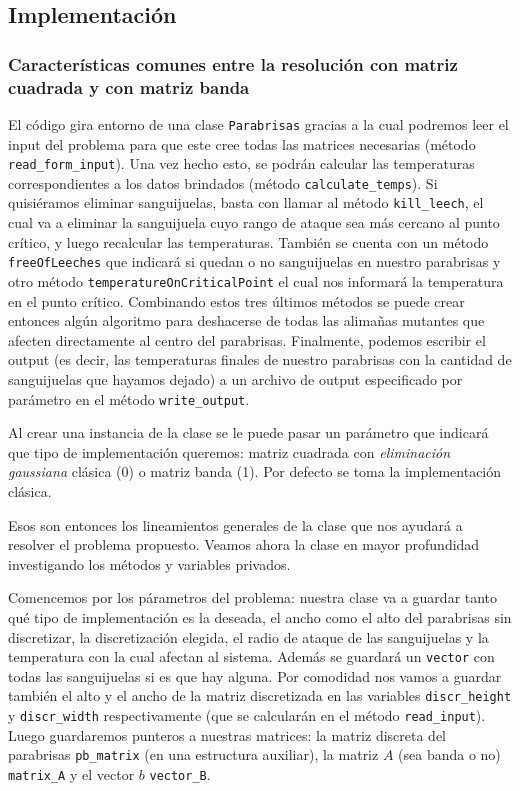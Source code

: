 \subsection{Implementación}

\subsubsection{Características comunes entre la resolución con matriz cuadrada y con matriz banda}

El código gira entorno de una clase \texttt{Parabrisas} gracias a la cual podremos leer el input del problema para que este cree todas las matrices necesarias (método \texttt{read\_form\_input}). Una vez hecho esto, se podrán calcular las temperaturas correspondientes a los datos brindados (método \texttt{calculate\_temps}). Si quisiéramos eliminar sanguijuelas, basta con llamar al método \texttt{kill\_leech}, el cual va a eliminar la sanguijuela cuyo rango de ataque sea más cercano al punto crítico, y luego recalcular las temperaturas. También se cuenta con un método \texttt{freeOfLeeches} que indicará si quedan o no sanguijuelas en nuestro parabrisas y otro método \texttt{temperatureOnCriticalPoint} el cual nos informará la temperatura en el punto crítico. Combinando estos tres últimos métodos se puede crear entonces algún algoritmo para deshacerse de todas las alimañas mutantes que afecten directamente al centro del parabrisas. Finalmente, podemos escribir el output (es decir, las temperaturas finales de nuestro parabrisas con la cantidad de sanguijuelas que hayamos dejado) a un archivo de output especificado por parámetro en el método \texttt{write\_output}.

Al crear una instancia de la clase se le puede pasar un parámetro que indicará que tipo de implementación queremos: matriz cuadrada con \textit{eliminación gaussiana} clásica (0) o matriz banda (1). Por defecto se toma la implementación clásica.

\vspace{\baselineskip}

Esos son entonces los lineamientos generales de la clase que nos ayudará a resolver el problema propuesto. Veamos ahora la clase en mayor profundidad investigando los métodos y variables privados.

Comencemos por los párametros del problema: nuestra clase va a guardar tanto qué tipo de implementación es la deseada, el ancho como el alto del parabrisas sin discretizar, la discretización elegida, el radio de ataque de las sanguijuelas y la temperatura con la cual afectan al sistema. Además se guardará un \texttt{vector} con todas las sanguijuelas si es que hay alguna. Por comodidad nos vamos a guardar también el alto y el ancho de la matriz discretizada en las variables \texttt{discr\_height} y \texttt{discr\_width} respectivamente (que se calcularán en el método \texttt{read\_input}). Luego guardaremos punteros a nuestras matrices: la matriz discreta del parabrisas \texttt{pb\_matrix} (en una estructura auxiliar), la matriz $A$ (sea banda o no) \texttt{matrix\_A} y el vector $b$ \texttt{vector\_B}.

